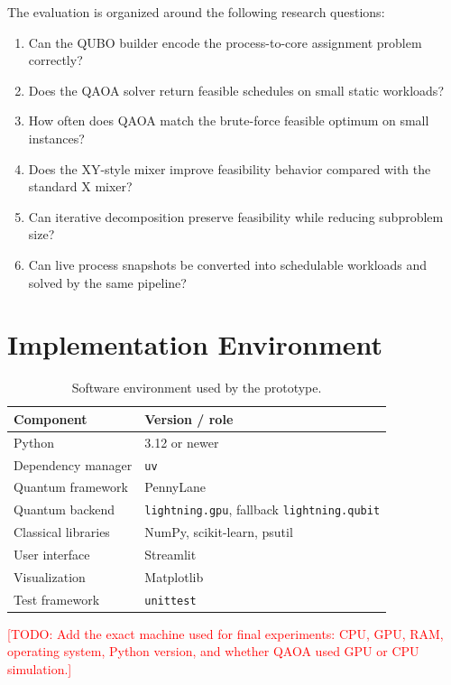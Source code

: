 \documentclass[12pt,a4paper,oneside]{report}
\newcommand{\todo}[1]{\textcolor{red}{[TODO: #1]}}
\begin{document}
The evaluation is organized around the following research questions:

\begin{enumerate}
  \item Can the QUBO builder encode the process-to-core assignment problem
  correctly?
  \item Does the QAOA solver return feasible schedules on small static
  workloads?
  \item How often does QAOA match the brute-force feasible optimum on small
  instances?
  \item Does the XY-style mixer improve feasibility behavior compared with the
  standard X mixer?
  \item Can iterative decomposition preserve feasibility while reducing
  subproblem size?
  \item Can live process snapshots be converted into schedulable workloads and
  solved by the same pipeline?
\end{enumerate}

\section{Implementation Environment}

\begin{table}[h]
  \centering
  \caption{Software environment used by the prototype.}
  \label{tab:software-environment}
  \begin{tabular}{ll}
    \toprule
    Component & Version / role \\
    \midrule
    Python & 3.12 or newer \\
    Dependency manager & \texttt{uv} \\
    Quantum framework & PennyLane \\
    Quantum backend & \texttt{lightning.gpu}, fallback \texttt{lightning.qubit} \\
    Classical libraries & NumPy, scikit-learn, psutil \\
    User interface & Streamlit \\
    Visualization & Matplotlib \\
    Test framework & \texttt{unittest} \\
    \bottomrule
  \end{tabular}
\end{table}

\todo{Add the exact machine used for final experiments: CPU, GPU, RAM, operating
system, Python version, and whether QAOA used GPU or CPU simulation.}
\end{document}
